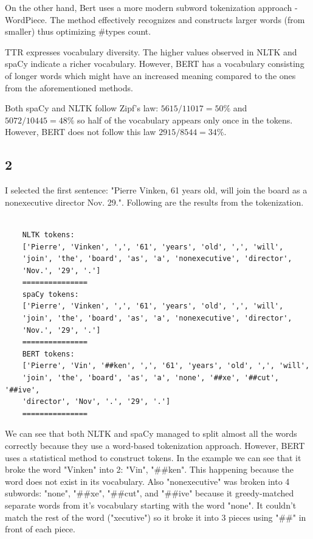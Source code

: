 \documentclass[8pt,a4paper]{report}%
\begin{document}
On the other hand, Bert uses a more modern subword tokenization approach - WordPiece. The method effectively recognizes and constructs larger words (from smaller) thus optimizing \#types count.

TTR expresses vocabulary diversity. The higher values observed in NLTK and spaCy indicate a richer vocabulary. However, BERT has a vocabulary consisting of longer words which might have an increased meaning compared to the ones from the aforementioned methods.

Both spaCy and NLTK follow Zipf's law:
$5615/11017=50\%$ and $5072/10445=48\%$ so half of the vocabulary appears only once in the tokens. However, BERT does not follow this law $2915/8544=34\%$.

\subsection*{2}

I selected the first sentence: "Pierre Vinken, 61 years old, will join the board as a nonexecutive director Nov. 29.". Following are the results from the tokenization.

\begin{lstlisting}

    NLTK tokens:
    ['Pierre', 'Vinken', ',', '61', 'years', 'old', ',', 'will',
    'join', 'the', 'board', 'as', 'a', 'nonexecutive', 'director',
    'Nov.', '29', '.']
    ===============
    spaCy tokens:
    ['Pierre', 'Vinken', ',', '61', 'years', 'old', ',', 'will',
    'join', 'the', 'board', 'as', 'a', 'nonexecutive', 'director',
    'Nov.', '29', '.']
    ===============
    BERT tokens:
    ['Pierre', 'Vin', '##ken', ',', '61', 'years', 'old', ',', 'will',
    'join', 'the', 'board', 'as', 'a', 'none', '##xe', '##cut', '##ive',
    'director', 'Nov', '.', '29', '.']
    ===============

\end{lstlisting}

We can see that both NLTK and spaCy managed to split almost all the words correctly because they use a word-based tokenization approach. However, BERT uses a statistical method to construct tokens. In the example we can see that it broke the word "Vinken" into 2: "Vin", "\#\#ken". This happening because the word does not exist in its vocabulary. Also "nonexecutive" was broken into 4 subwords: "none", "\#\#xe", "\#\#cut", and "\#\#ive" because it greedy-matched separate words from it's vocabulary starting with the word "none". It couldn't match the rest of the word ("xecutive") so it broke it into 3 pieces using "\#\#" in front of each piece.
\end{document}
